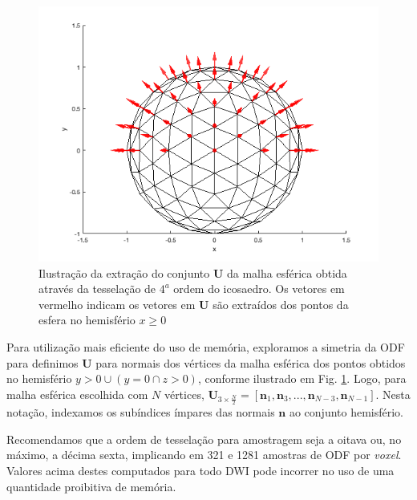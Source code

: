 \documentclass[
    12pt,                %
    oneside,            %
    a4paper,            %
    english,            %
    french,                %
    spanish,            %
    brazil                %
    ]{abntex2}
\begin{document}







\begin{figure}[ht]
    \centering
    \includegraphics[width=.8\linewidth, angle=0]{figs/HARDI/icosphere_normals.png}
    \caption{
    Ilustração da extração do conjunto $\mathbf{U}$ da malha esférica obtida através da tesselação de $4^a$ ordem do icosaedro. Os vetores em vermelho indicam os vetores em $\mathbf{U}$ são extraídos dos pontos da esfera no hemisfério $x\geq 0$
    }
    \label{fig::direcoes}
   \hspace{1pt}
\end{figure}

\todo{\textcolor{green}{Direções amostradas com base em subdivisões de um icosaedro.}}


Para utilização mais eficiente do uso de memória, exploramos a simetria da ODF para definimos $\mathbf{U}$ para normais dos vértices da malha esférica dos pontos obtidos no hemisfério $y > 0 \cup (y = 0 \cap z > 0)$, conforme ilustrado em Fig. \ref{fig::direcoes}. Logo, para malha esférica escolhida com $N$ vértices, $\mathbf{U}_{3\times \frac{N}{2}} = [
\mathbf{n}_1,
\mathbf{n}_3, ..., 
\mathbf{n}_{N-3},
\mathbf{n}_{N-1}
]$. Nesta notação, indexamos os subíndices ímpares das normais $\mathbf{n}$ ao conjunto hemisfério.

Recomendamos que a ordem de tesselação para amostragem seja a oitava ou, no máximo, a décima sexta, implicando em 321 e 1281 amostras de ODF por \textit{voxel}. Valores acima destes computados para todo DWI pode incorrer no uso de uma quantidade proibitiva de memória.
\end{document}
